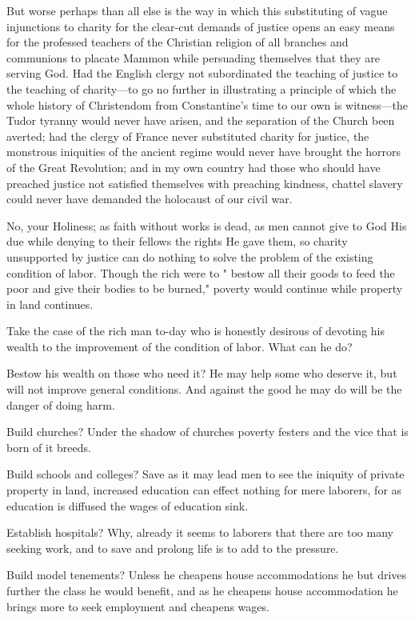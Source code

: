 \documentclass{book}
\begin{document}
But worse perhaps than all else is the way in which this substituting of vague injunctions to charity for the clear-cut demands of justice opens an easy means for the professed teachers of the Christian religion of all branches and communions to placate Mammon while persuading themselves that they are serving God. Had the English clergy not subordinated the teaching of justice to the teaching of charity—to go no further in illustrating a principle of which the whole history of Christendom from Constantine’s time to our own is witness—the Tudor tyranny would never have arisen, and the separation of the Church been averted; had the clergy of France never substituted charity for justice, the monstrous iniquities of the ancient regime would never have brought the horrors of the Great Revolution; and in my own country had those who should have preached justice not satisfied themselves with preaching kindness, chattel slavery could never have demanded the holocaust of our civil war.

No, your Holiness; as faith without works is dead, as men cannot give to God His due while denying to their fellows the rights He gave them, so charity unsupported by justice can do nothing to solve the problem of the existing condition of labor. Though the rich were to " bestow all their goods to feed the poor and give their bodies to be burned," poverty would continue while property in land continues.

Take the case of the rich man to-day who is honestly desirous of devoting his wealth to the improvement of the condition of labor. What can he do?

Bestow his wealth on those who need it? He may help some who deserve it, but will not improve general conditions. And against the good he may do will be the danger of doing harm.

Build churches? Under the shadow of churches poverty festers and the vice that is born of it breeds.

Build schools and colleges? Save as it may lead men to see the iniquity of private property in land, increased education can effect nothing for mere laborers, for as education is diffused the wages of education sink.

Establish hospitals? Why, already it seems to laborers that there are too many seeking work, and to save and prolong life is to add to the pressure.

Build model tenements? Unless he cheapens house accommodations he but drives further the class he would benefit, and as he cheapens house accommodation he brings more to seek employment and cheapens wages.
\end{document}

